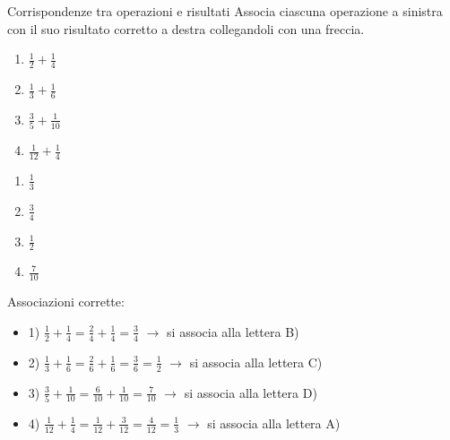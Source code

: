 \begin{esercizio}{Corrispondenze tra operazioni e risultati}
Associa ciascuna operazione a sinistra con il suo risultato corretto a destra collegandoli con una freccia.

\vspace{0.4cm}
\begin{minipage}{0.48\linewidth}
  \begin{enumerate}[label=\arabic*)]
    \item $\frac{1}{2} + \frac{1}{4}$
    \vspace{0.4cm}
    \item $\frac{1}{3} + \frac{1}{6}$
    \vspace{0.4cm}
    \item $\frac{3}{5} + \frac{1}{10}$
    \vspace{0.4cm}
    \item $\frac{1}{12} + \frac{1}{4}$
  \end{enumerate}
\end{minipage}
\hfill
\begin{minipage}{0.48\linewidth}
  \begin{enumerate}[label=\Alph*)]
    \item $\frac{1}{3}$
    \vspace{0.4cm}
    \item $\frac{3}{4}$
    \vspace{0.4cm}
    \item $\frac{1}{2}$
    \vspace{0.4cm}
    \item $\frac{7}{10}$
  \end{enumerate}
\end{minipage}
\vspace{0.4cm}

\responsespace{2.2cm}

\begin{soluzione}
  Associazioni corrette:
  \begin{itemize}
    \item 1) $\frac{1}{2} + \frac{1}{4} = \frac{2}{4} + \frac{1}{4} = \frac{3}{4}$ $\to$ si associa alla lettera B)
    \item 2) $\frac{1}{3} + \frac{1}{6} = \frac{2}{6} + \frac{1}{6} = \frac{3}{6} = \frac{1}{2}$ $\to$ si associa alla lettera C)
    \item 3) $\frac{3}{5} + \frac{1}{10} = \frac{6}{10} + \frac{1}{10} = \frac{7}{10}$ $\to$ si associa alla lettera D)
    \item 4) $\frac{1}{12} + \frac{1}{4} = \frac{1}{12} + \frac{3}{12} = \frac{4}{12} = \frac{1}{3}$ $\to$ si associa alla lettera A)
  \end{itemize}
\end{soluzione}
\end{esercizio}

